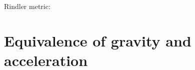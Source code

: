 \documentclass[11pt,oneside%
]{memoir}
\newenvironment{eqna}{\begin{IEEEeqnarray*}{c}}{\end{IEEEeqnarray*}\ignorespacesafterend}
\newcommand{\dd}{\mathrm{d}}
\begin{document}
Rindler metric:



\section{Equivalence of gravity and acceleration}








\end{document}

